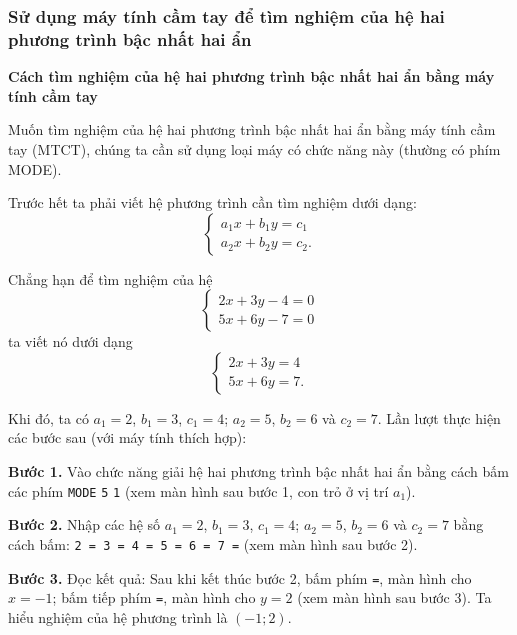 \begin{lesson}
    \answerline
    \answerline
    \answerline

    \subsubsection{Sử dụng máy tính cầm tay để tìm nghiệm của hệ hai phương trình bậc nhất hai ẩn}

    \textbf{Cách tìm nghiệm của hệ hai phương trình bậc nhất hai ẩn bằng máy tính cầm tay}

    Muốn tìm nghiệm của hệ hai phương trình bậc nhất hai ẩn bằng máy tính cầm tay (MTCT), chúng ta cần sử dụng loại máy có chức năng này (thường có phím MODE).

    Trước hết ta phải viết hệ phương trình cần tìm nghiệm dưới dạng:
    \[
        \begin{cases}
            a_1x+b_1y=c_1\\
            a_2x+b_2y=c_2.
        \end{cases}
    \]

    Chẳng hạn để tìm nghiệm của hệ
    \[
        \begin{cases}
            2x+3y-4=0\\
            5x+6y-7=0
        \end{cases}
    \]
    ta viết nó dưới dạng
    \[
        \begin{cases}
            2x+3y=4\\
            5x+6y=7.
        \end{cases}
    \]

    Khi đó, ta có $a_1=2$, $b_1=3$, $c_1=4$; $a_2=5$, $b_2=6$ và $c_2=7$. Lần lượt thực hiện các bước sau (với máy tính thích hợp):

    \textbf{Bước 1.} Vào chức năng giải hệ hai phương trình bậc nhất hai ẩn bằng cách bấm các phím \texttt{MODE} \texttt{5} \texttt{1} (xem màn hình sau bước 1, con trỏ ở vị trí $a_1$).


    \textbf{Bước 2.} Nhập các hệ số $a_1=2$, $b_1=3$, $c_1=4$; $a_2=5$, $b_2=6$ và $c_2=7$ bằng cách bấm: \texttt{2 = 3 = 4 = 5 = 6 = 7 =} (xem màn hình sau bước 2).


    \textbf{Bước 3.} Đọc kết quả: Sau khi kết thúc bước 2, bấm phím \texttt{=}, màn hình cho $x=-1$; bấm tiếp phím \texttt{=}, màn hình cho $y=2$ (xem màn hình sau bước 3). Ta hiểu nghiệm của hệ phương trình là $(-1;2)$.


\end{lesson}
